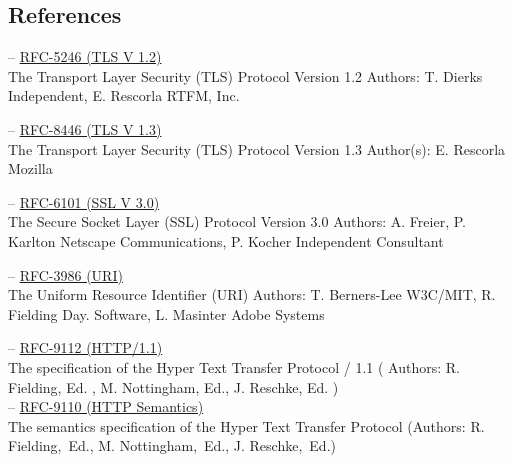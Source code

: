 \documentclass[10pt,a4paper,english]{article}
\begin{document}
\begin{multicols}{2}
\section{References}
\label{sec:references}
\begin{flushleft}
\hspace*{1em}-- \href{https://datatracker.ietf.org/doc/html/rfc5246}{RFC-5246 (TLS V 1.2)}\\The Transport Layer Security (TLS) Protocol Version 1.2 Authors:   T. Dierks
Independent,  E. Rescorla RTFM, Inc.\\
\end{flushleft}
\begin{flushleft}
\hspace*{1em}-- \href{https://datatracker.ietf.org/doc/html/rfc8446}{RFC-8446 (TLS V 1.3)}\\The Transport Layer Security (TLS) Protocol Version 1.3 Author(s): E. Rescorla Mozilla\\
\end{flushleft}
\begin{flushleft}
\hspace*{1em}-- \href{https://datatracker.ietf.org/doc/html/rfc6101}{RFC-6101 (SSL V 3.0)}\\The Secure Socket Layer  (SSL) Protocol Version 3.0 Authors: A. Freier, P. Karlton Netscape Communications, P. Kocher Independent Consultant\\
\end{flushleft}
\begin{flushleft}
\hspace*{1em}-- \href{https://datatracker.ietf.org/doc/html/rfc3986}{RFC-3986 (URI)}\\The Uniform Resource Identifier (URI) Authors: T. Berners-Lee W3C/MIT, R. Fielding Day. Software, L. Masinter Adobe Systems\\
\end{flushleft}
\begin{flushleft}
\hspace*{1em}-- \href{https://www.rfc-editor.org/rfc/rfc9112.pdf}{RFC-9112 (HTTP/1.1)}\\The specification of the Hyper Text Transfer Protocol / 1.1 ( Authors: R. Fielding, Ed. , M. Nottingham, Ed.,  J. Reschke, Ed. ) \\
\hspace*{1em}-- \href{https://www.rfc-editor.org/rfc/rfc9110.pdf}{RFC-9110 (HTTP Semantics)} \\The semantics specification of the Hyper Text Transfer Protocol (Authors: R. Fielding, Ed., M. Nottingham, Ed., J. Reschke, Ed.)\\

\end{flushleft}
\end{multicols}
\end{document}
